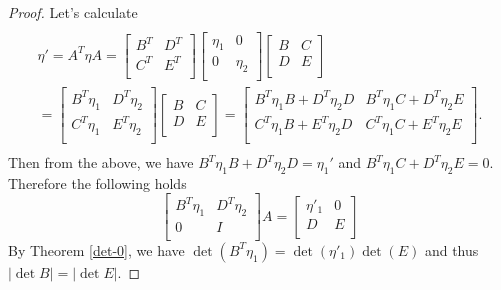 \documentclass[main.tex]{subfiles}
\begin{document}
\begin{proof}
\noindent
Let's calculate
\begin{multline*}
\\
\eta' = A^T \eta A = \begin{bmatrix}
    B^T &  D^T \\
    C^T & E^T \\
\end{bmatrix}
\begin{bmatrix}
    \eta_1 &  0 \\
    0 & \eta_2 \\
\end{bmatrix}
\begin{bmatrix}
    B &  C \\
    D & E \\
\end{bmatrix}
\\ = \begin{bmatrix}
    B^T\eta_1 &  D^T\eta_2 \\
    C^T\eta_1 & E^T\eta_2 \\
\end{bmatrix}
\begin{bmatrix}
    B &  C \\
    D & E \\
\end{bmatrix}
= \begin{bmatrix}
    B^T\eta_1B + D^T\eta_2 D &  B^T\eta_1 C + D^T\eta_2E \\
    C^T\eta_1 B + E^T\eta_2 D & C^T\eta_1C + E^T\eta_2 E \\
\end{bmatrix}.
\\
\end{multline*} 
Then from the above, we have $B^T\eta_1B + D^T\eta_2 D = \eta_1'$ and $B^T\eta_1 C + D^T\eta_2E = 0$.
Therefore the following holds
\begin{equation}
\begin{bmatrix}
    B^T\eta_1 &  D^T\eta_2 \\
    0 & I \\
\end{bmatrix} 
A = 
\begin{bmatrix}
    \eta'_1 &  0 \\
    D & E \\
\end{bmatrix}
\end{equation}
By Theorem \ref{det-0}, we have $\det(B^T\eta_1) = \det(\eta'_1)\det (E)$ and thus $|\det B| = |\det E|$.
\end{proof}
\end{document}

